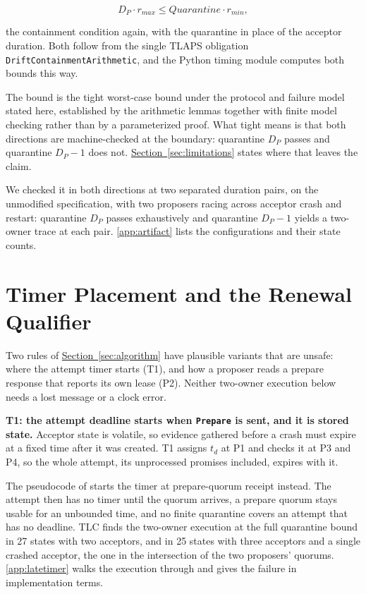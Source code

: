\documentclass[final,5p,times,twocolumn,number]{elsarticle}
\newcommand{\code}[1]{\texttt{#1}}
\newcommand{\secref}[1]{\hyperref[#1]{Section~\ref*{#1}}}
\begin{document}
\[
  D_P \cdot r_{max} \leq Quarantine \cdot r_{min},
\]

the containment condition again, with the quarantine in place of the acceptor duration.  Both follow from the single TLAPS obligation \code{DriftContainmentArithmetic}, and the Python timing module computes both bounds this way.

The bound is the tight worst-case bound under the protocol and failure model stated here, established by the arithmetic lemmas together with finite model checking rather than by a parameterized proof.  What tight means is that both directions are machine-checked at the boundary: quarantine $D_P$ passes and quarantine $D_P - 1$ does not.  \secref{sec:limitations} states where that leaves the claim.

We checked it in both directions at two separated duration pairs, on the unmodified specification, with two proposers racing across acceptor crash and restart: quarantine $D_P$ passes exhaustively and quarantine $D_P - 1$ yields a two-owner trace at each pair.  \ref{app:artifact} lists the configurations and their state counts.

\section{Timer Placement and the Renewal Qualifier}\label{sec:designspace}

Two rules of \secref{sec:algorithm} have plausible variants that are unsafe: where the attempt timer starts (T1), and how a proposer reads a prepare response that reports its own lease (P2).  Neither two-owner execution below needs a lost message or a clock error.

\smallskip
\noindent\textbf{T1: the attempt deadline starts when \code{Prepare} is sent, and it is stored state.}  Acceptor state is volatile, so evidence gathered before a crash must expire at a fixed time after it was created.  T1 assigns $t_d$ at P1 and checks it at P3 and P4, so the whole attempt, its unprocessed promises included, expires with it.

The pseudocode of \cite{ref1} starts the timer at prepare-quorum receipt instead.  The attempt then has no timer until the quorum arrives, a prepare quorum stays usable for an unbounded time, and no finite quarantine covers an attempt that has no deadline.  TLC finds the two-owner execution at the full quarantine bound in 27 states with two acceptors, and in 25 states with three acceptors and a single crashed acceptor, the one in the intersection of the two proposers' quorums.  \ref{app:latetimer} walks the execution through and gives the failure in implementation terms.
\end{document}
